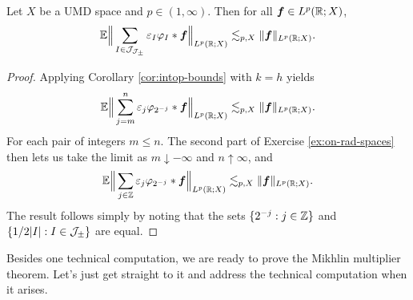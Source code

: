 \begin{lem}\label{lem:reparam-LP}
  Let $X$ be a UMD space and $p \in (1,\infty)$.
  Then for all $\bm{f} \in L^p(\mathbb{R};X)$,
  \begin{equation*}
    \mathbb{E} \Big\| \sum_{I \in \mathcal{J}_{\mathcal{J}_{\pm}}} \varepsilon_{I} \varphi_{I} \ast \bm{f} \Big\|_{L^p(\mathbb{R};X)} \lesssim_{p,X} \|\bm{f}\|_{L^p(\mathbb{R};X)}.
  \end{equation*}
\end{lem}

\begin{proof}
  Applying Corollary \ref{cor:intop-bounds} with $k = h$ yields
  \begin{equation*}
    \mathbb{E} \Big\| \sum_{j = m}^{n} \varepsilon_{j} \varphi_{2^{-j}} \ast \bm{f} \Big\|_{L^p(\mathbb{R};X)} \lesssim_{p,X} \|\bm{f}\|_{L^p(\mathbb{R};X)}.
  \end{equation*}
  For each pair of integers $m \leq n$.
  The second part of Exercise \ref{ex:on-rad-spaces} then lets us take the limit as $m \downarrow -\infty$ and $n \uparrow \infty$, and
  \begin{equation*}
    \mathbb{E} \Big\| \sum_{j \in \mathbb{Z}} \varepsilon_{j} \varphi_{2^{-j}} \ast \bm{f} \Big\|_{L^p(\mathbb{R};X)} \lesssim_{p,X} \|\bm{f}\|_{L^p(\mathbb{R};X)}.
\end{equation*}
The result follows simply by noting that the sets $\{2^{-j} : j \in \mathbb{Z}\}$ and $\{1/2|I| : I \in \mathcal{J}_{\pm}\}$ are equal.
\end{proof}

Besides one technical computation, we are ready to prove the Mikhlin multiplier theorem.
Let's just get straight to it and address the technical computation when it arises.

